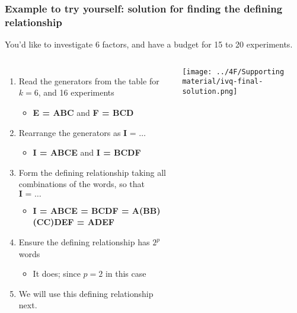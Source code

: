 \begin{frame}\frametitle{Example to try yourself: {\color{myOrange}solution} for finding the defining relationship}
	
	\vspace{0.5cm}
	You'd like to investigate 6 factors, and have a budget for 15 to 20 experiments.
	
	\vspace{0.5cm}
	\begin{columns}[T]
			\begin{enumerate}
				\item	Read the generators from the table for $k=6$, and 16 experiments
					\begin{itemize}
						\item	\textbf{E = ABC}	and  \textbf{F = BCD}
					\end{itemize}
				\item	Rearrange the generators as  $\textbf{I = \ldots}$
					\begin{itemize}
						\item	\textbf{I = ABCE}	and  \textbf{I = BCDF}
					\end{itemize}
			 	\item	Form the {\color{purple}defining relationship} taking all combinations of the words, so that $\textbf{I = \ldots}$
					\begin{itemize}
						\item	\textbf{I = ABCE = BCDF = A(BB)(CC)DEF = ADEF}
					\end{itemize}
			 	\item	Ensure the defining relationship has $2^p$ words
					\begin{itemize}
						\item	It does; since $p=2$ in this case
					\end{itemize} 
				\item	We will use this defining relationship next.
			\end{enumerate}
			
			\centerline{\texttt{[image: ../4F/Supporting material/ivq-final-solution.png]}}

	\end{columns}

	
\end{frame}




